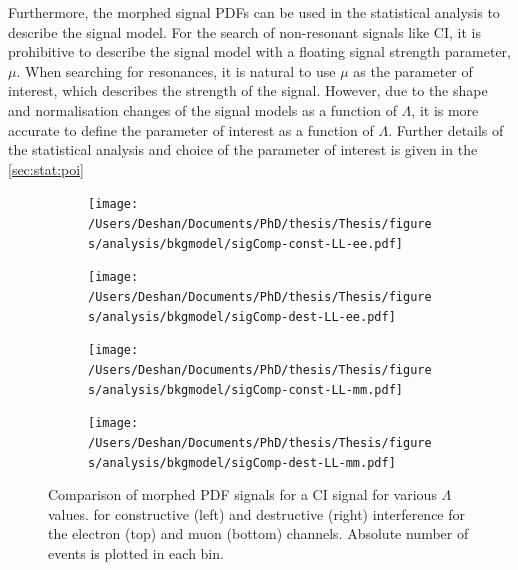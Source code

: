 Furthermore, the morphed signal PDFs can be used in the statistical analysis to describe the signal model. For the search of non-resonant signals like CI, it is prohibitive to describe the signal model with a floating signal strength parameter, $\mu$. When searching for resonances, it is natural to use $\mu$ as the parameter of interest, which describes the strength of the signal. However, due to the shape and normalisation changes of the signal models as a function of $\Lambda$, it is more accurate to define the parameter of interest as a function of $\Lambda$. Further details of the statistical analysis and choice of the parameter of interest is given in the \cref{sec:stat:poi}

\begin{figure}[h!]
    \centering
    \begin{subfigure}[b]{0.49\textwidth}
        \centering
        \texttt{[image: /Users/Deshan/Documents/PhD/thesis/Thesis/figures/analysis/bkgmodel/sigComp-const-LL-ee.pdf]}
        \label{fig:bkgmodel:Morphee1}
    \end{subfigure}
    \begin{subfigure}[b]{0.49\textwidth}
        \centering
        \texttt{[image: /Users/Deshan/Documents/PhD/thesis/Thesis/figures/analysis/bkgmodel/sigComp-dest-LL-ee.pdf]}
        \label{fig:bkgmodel:Morphee2}
    \end{subfigure}
    \begin{subfigure}[b]{0.49\textwidth}
        \centering
        \texttt{[image: /Users/Deshan/Documents/PhD/thesis/Thesis/figures/analysis/bkgmodel/sigComp-const-LL-mm.pdf]}
        \label{fig:bkgmodel:Morphmm1}
    \end{subfigure}
    \begin{subfigure}[b]{0.49\textwidth}
        \centering
        \texttt{[image: /Users/Deshan/Documents/PhD/thesis/Thesis/figures/analysis/bkgmodel/sigComp-dest-LL-mm.pdf]}
        \label{fig:bkgmodel:Morphmm2}
    \end{subfigure}
    \caption[Morphed signal PDF produced at various $\Lambda$ values compared with the reweighted MC template.]{Comparison of morphed PDF signals for a CI signal for various $\Lambda$ values. for constructive (left) and destructive (right) interference for the electron (top) and muon (bottom) channels. Absolute number of events is plotted in each bin.}
    \label{fig:bkgmodel:Morph}
\end{figure}

